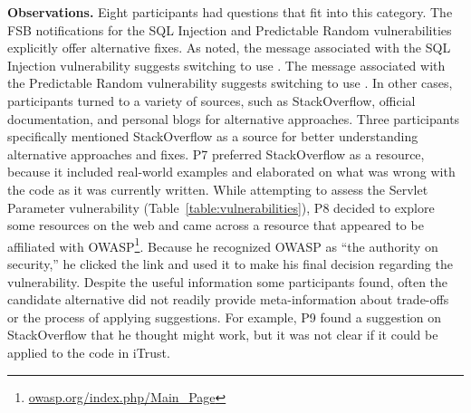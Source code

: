 \documentclass{acm_proc_article-sp}
\begin{document}
\noindent\textbf{Observations.}
Eight participants had questions that fit into this category. 
The FSB notifications for the SQL Injection and Predictable Random vulnerabilities explicitly offer alternative fixes. 
As noted, the message associated with the SQL Injection vulnerability suggests switching to use . 
The message associated with the Predictable Random vulnerability suggests switching to use . 
In other cases, participants turned to a variety of sources, such as StackOverflow, official documentation, and personal blogs for alternative approaches. 
Three participants specifically mentioned StackOverflow as a source for better understanding alternative approaches and fixes. 
P7 preferred StackOverflow as a resource, because it included real-world examples and elaborated on what was wrong with the code as it was currently written.  
While attempting to assess the Servlet Parameter vulnerability (Table~\ref{table:vulnerabilities}), P8 decided to explore some resources on the web and came across a resource that appeared to be affiliated with OWASP\footnote{\url{owasp.org/index.php/Main_Page}}. 
Because he recognized OWASP as ``the authority on security,'' he clicked the link and used it to make his final decision regarding the vulnerability. 
Despite the useful information some participants found, often the candidate alternative did not readily provide meta-information about trade-offs or the process of applying suggestions. 
For example, P9 found a suggestion on StackOverflow that he thought might work, but it was not clear if it could be applied to the code in iTrust. 






\end{document}
